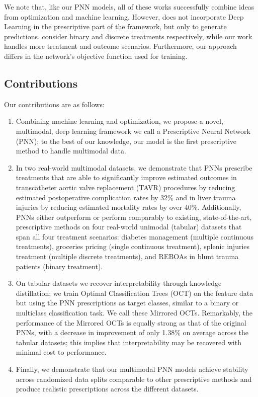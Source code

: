 \documentclass[10pt]{article} %
\begin{document}
We note that, like our PNN models, all of these works successfully combine ideas from optimization and machine learning. However, \citet{bergman2022janos} does not incorporate Deep Learning in the prescriptive part of the framework, but only to generate predictions. \citet{other-pnn, asterios} consider binary and discrete treatments respectively, while our work handles more treatment and outcome scenarios. Furthermore, our approach differs in the network's objective function used for training.

\subsection{Contributions}\label{subsec:contributions}

Our contributions are as follows:
\begin{enumerate}
    \item Combining machine learning and optimization, we propose a novel, multimodal, deep learning framework we call a Prescriptive Neural Network (PNN); to the best of our knowledge, our model is the first prescriptive method to handle multimodal data.

    \item In two real-world multimodal datasets, we demonstrate that PNNs prescribe treatments that are able to significantly improve estimated outcomes in transcatheter aortic valve replacement (TAVR) procedures by reducing estimated postoperative complication rates by 32\% and in liver trauma injuries by reducing estimated mortality rates by over 40\%. Additionally, PNNs either outperform or perform comparably to existing, state-of-the-art, prescriptive methods on four real-world unimodal (tabular) datasets that span all four treatment scenarios: diabetes management (multiple continuous treatments), groceries pricing (single continuous treatment), splenic injuries treatment (multiple discrete treatments), and REBOAs in blunt trauma patients (binary treatment). 

    \item On tabular datasets we recover interpretability through knowledge distillation; we train Optimal Classification Trees (OCT) \citep{optimal-classification-trees,MLbook} on the feature data but using the PNN prescriptions as target classes, similar to a binary or multiclass classification task. We call these Mirrored OCTs. Remarkably, the performance of the Mirrored OCTs is equally strong as that of the original PNNs, with a decrease in improvement of only 1.38\% on average across the tabular datasets; this implies that interpretability may be recovered with minimal cost to performance. 
    
    \item Finally, we demonstrate that our multimodal PNN models achieve stability across randomized data splits comparable to other prescriptive methods and produce realistic prescriptions across the different datasets.
    
\end{enumerate}
\end{document}
